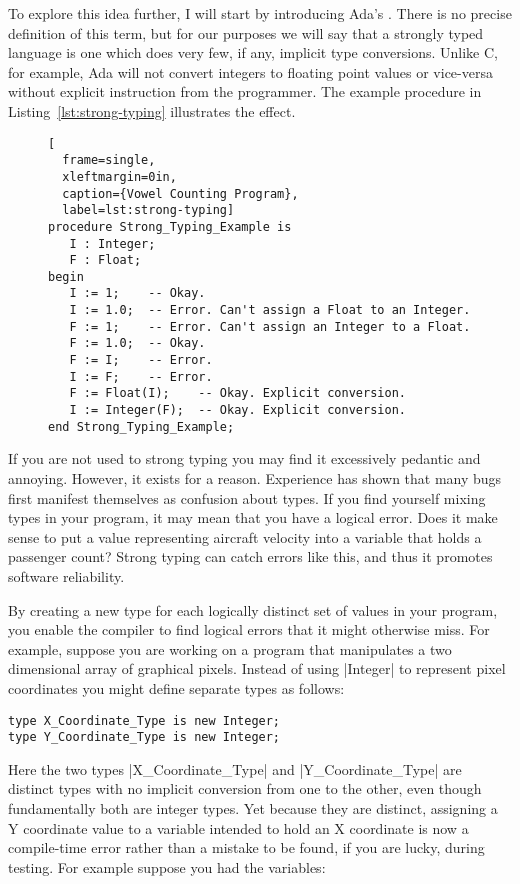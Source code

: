 To explore this idea further, I will start by introducing Ada's . There
is no precise definition of this term, but for our purposes we will say that a strongly typed
language is one which does very few, if any, implicit type conversions. Unlike C, for example,
Ada will not convert integers to floating point values or vice-versa without explicit
instruction from the programmer. The example procedure in Listing~\ref{lst:strong-typing}
illustrates the effect.

\begin{figure}[tbhp]
\begin{lstlisting}[
  frame=single,
  xleftmargin=0in,
  caption={Vowel Counting Program},
  label=lst:strong-typing]
procedure Strong_Typing_Example is
   I : Integer;
   F : Float;
begin
   I := 1;    -- Okay.
   I := 1.0;  -- Error. Can't assign a Float to an Integer.
   F := 1;    -- Error. Can't assign an Integer to a Float.
   F := 1.0;  -- Okay.
   F := I;    -- Error.
   I := F;    -- Error.
   F := Float(I);    -- Okay. Explicit conversion.
   I := Integer(F);  -- Okay. Explicit conversion.
end Strong_Typing_Example;
\end{lstlisting}
\end{figure}

If you are not used to strong typing you may find it excessively pedantic and annoying. However,
it exists for a reason. Experience has shown that many bugs first manifest themselves as
confusion about types. If you find yourself mixing types in your program, it may mean that you
have a logical error. Does it make sense to put a value representing aircraft velocity into a
variable that holds a passenger count? Strong typing can catch errors like this, and thus it
promotes software reliability.

By creating a new type for each logically distinct set of values in your program, you enable the
compiler to find logical errors that it might otherwise miss. For example, suppose you are
working on a program that manipulates a two dimensional array of graphical pixels. Instead of
using |Integer| to represent pixel coordinates you might define separate types as follows:

\begin{lstlisting}
type X_Coordinate_Type is new Integer;
type Y_Coordinate_Type is new Integer;
\end{lstlisting}

Here the two types |X_Coordinate_Type| and |Y_Coordinate_Type| are distinct types with no
implicit conversion from one to the other, even though fundamentally both are integer types. Yet
because they are distinct, assigning a Y coordinate value to a variable intended to hold an X
coordinate is now a compile-time error rather than a mistake to be found, if you are lucky,
during testing. For example suppose you had the variables:

